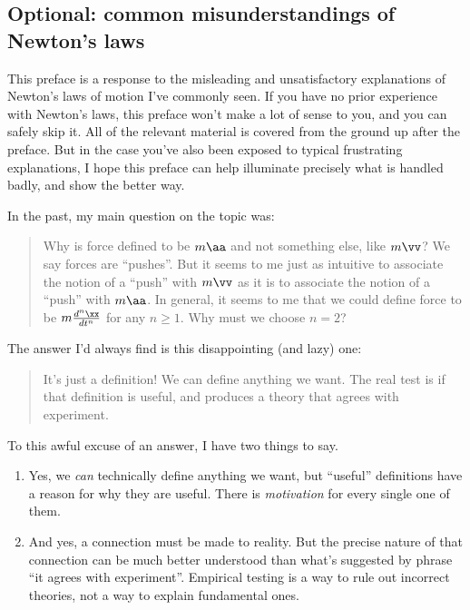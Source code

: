 \documentclass{article}
\begin{document}
\subsection*{Optional: common misunderstandings of Newton's laws}

This preface is a response to the misleading and unsatisfactory explanations of Newton's laws of motion I've commonly seen. If you have no prior experience with Newton's laws, this preface won't make a lot of sense to you, and you can safely skip it. All of the relevant material is covered from the ground up after the preface. But in the case you've also been exposed to typical frustrating explanations, I hope this preface can help illuminate precisely what is handled badly, and show the better way.

In the past, my main question on the topic was:

\begin{quote}
    Why is force defined to be $m\aa$ and not something else, like $m \vv$? We say forces are ``pushes''. But it seems to me just as intuitive to associate the notion of a ``push'' with $m\vv$ as it is to associate the notion of a ``push'' with $m\aa$. In general, it seems to me that we could define force to be $m\frac{d^n \xx}{dt^n}$ for any $n \geq 1$. Why must we choose $n = 2$?
\end{quote}

The answer I’d always find is this disappointing (and lazy) one:

\begin{quote}
    It’s just a definition! We can define anything we want. The real test is if that definition is useful, and produces a theory that agrees with experiment.
\end{quote}

To this awful excuse of an answer, I have two things to say.

\begin{enumerate}
    \item Yes, we \textit{can} technically define anything we want, but ``useful'' definitions have a reason for why they are useful. There is \textit{motivation} for every single one of them.
    \item And yes, a connection must be made to reality. But the precise nature of that connection can be much better understood than what's suggested by phrase ``it agrees with experiment''. Empirical testing is a way to rule out incorrect theories, not a way to explain fundamental ones.
\end{enumerate}
\end{document}
